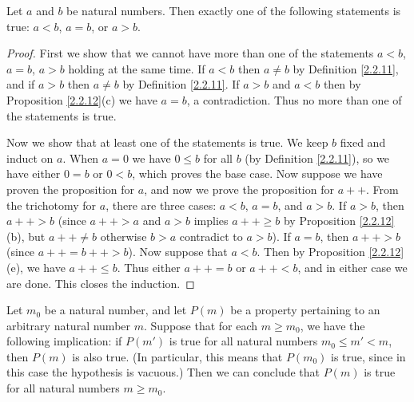\begin{proposition}\label{2.2.13}
    Let \(a\) and \(b\) be natural numbers.
    Then exactly one of the following statements is true: \(a < b\), \(a = b\), or \(a > b\).
\end{proposition}

\begin{proof}
    First we show that we cannot have more than one of the statements \(a < b\), \(a = b\), \(a > b\) holding at the same time.
    If \(a < b\) then \(a \neq b\) by Definition \ref{2.2.11}, and if \(a > b\) then \(a \neq b\) by Definition \ref{2.2.11}.
    If \(a > b\) and \(a < b\) then by Proposition \ref{2.2.12}(c) we have \(a = b\), a contradiction.
    Thus no more than one of the statements is true.

    Now we show that at least one of the statements is true.
    We keep \(b\) fixed and induct on \(a\).
    When \(a = 0\) we have \(0 \leq b\) for all \(b\) (by Definition \ref{2.2.11}), so we have either \(0 = b\) or \(0 < b\), which proves the base case.
    Now suppose we have proven the proposition for \(a\), and now we prove the proposition for \(a++\).
    From the trichotomy for \(a\), there are three cases: \(a < b\), \(a = b\), and \(a > b\).
    If \(a > b\), then \(a++ > b\) (since \(a++ > a\) and \(a > b\) implies \(a++ \geq b\) by Proposition \ref{2.2.12}(b), but \(a++ \neq b\) otherwise \(b > a\) contradict to \(a > b\)).
    If \(a = b\), then \(a++ > b\) (since \(a++ = b++ > b\)).
    Now suppose that \(a < b\).
    Then by Proposition \ref{2.2.12}(e), we have \(a++ \leq b\).
    Thus either \(a++ = b\) or \(a++ < b\), and in either case we are done.
    This closes the induction.
\end{proof}

\begin{proposition}\label{2.2.14}
    Let \(m_0\) be a natural number, and let \(P(m)\) be a property pertaining to an arbitrary natural number \(m\).
    Suppose that for each \(m \geq m_0\), we have the following implication: if \(P(m')\) is true for all natural numbers \(m_0 \leq m' < m\), then \(P(m)\) is also true.
    (In particular, this means that \(P(m_0)\) is true, since in this case the hypothesis is vacuous.)
    Then we can conclude that \(P(m)\) is true for all natural numbers \(m \geq m_0\).
\end{proposition}

